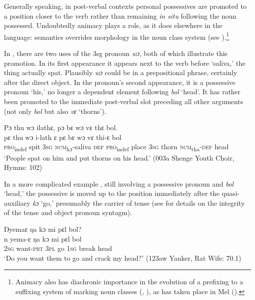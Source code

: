 Generally speaking, in post-verbal contexts personal possessives are promoted to a position closer to the verb rather than remaining \textit{in situ} following the noun possessed. Undoubtedly animacy plays a role, as it does elsewhere in the language: semantics overrides morphology in the noun class system (see ).\footnote{Animacy also has diachronic importance in the evolution of a prefixing to a suffixing system of marking noun classes (\citealt{Greenberg1977}, \citealt{Greenberg1978}), as has taken place in Mel (\citealt{Childs1983}).}

In , there are two uses of the 3sg pronoun \textit{wɔ}, both of which illustrate this promotion. In its first appearance it appears next to the verb before ‘saliva,' the thing actually spat. Plausibly \textit{wɔ} could be in a prepositional phrase, certainly after the direct object. In the pronoun's second appearance, it is a possessive pronoun ‘his,' no longer a dependent element following \textit{bol} ‘head'. It has rather been promoted to the immediate post-verbal slot preceding all other arguments (not only \textit{bol} but also \textit{vɛ} ‘thorns').

\ea%
    \label{ex:198}
    Pɔ thu wɔ ilathɛ, pɔ bɛ wɔ vɛ thɛ bol.\\
    \gll pɛ      thu  wɔ    i-lath        ɛ    pɛ      bɛ    wɔ    vɛ    thi-ɛ      bol\\
    \textsc{pro}\textsubscript{indef}  spit  \textsc{3sg}  \textsc{ncm}\textsubscript{hɔ}{}-saliva  \textsc{def}  \textsc{pro}\textsubscript{indef}  place  \textsc{3sg}  thorn  \textsc{ncm}\textsubscript{tha}\textsc{{}-def}  head\\
    \glt ‘People spat on him and put thorns on his head.' (003a Shenge Youth Choir, Hymns:  102)
\z

In a more complicated example , still involving a possessive pronoun and \textit{bol} ‘head,' the possessive is moved up to the position immediately after the quasi-auxiliary \textit{kɔ} ‘go,' presumably the carrier of tense (see  for details on the integrity of the tense and object pronoun syntagm).

\ea%
    \label{ex:199}
    Ŋyemaɛ ŋa kɔ mi pɛl bol?\\
    \gll n    yema-ɛ    ŋa    kɔ    mi    pɛl      bol\\
    2\textsc{sg}  want-\textsc{prt}  3\textsc{pl}  go    1\textsc{sg}  break    head\\
    \glt ‘Do you want them to go and crack my head?' (123aw Yanker, Rat Wife: 70.1)
\z

